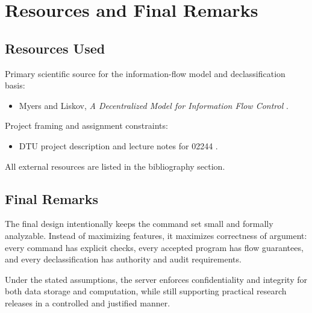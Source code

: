\section{Resources and Final Remarks}

\subsection{Resources Used}

Primary scientific source for the information-flow model and declassification basis:
\begin{itemize}
	\item Myers and Liskov, \emph{A Decentralized Model for Information Flow Control} \cite{MyersLiskov97}.
\end{itemize}

Project framing and assignment constraints:
\begin{itemize}
	\item DTU project description and lecture notes for 02244 \cite{ProjectDescription,Week4,Week5}.
\end{itemize}

All external resources are listed in the bibliography section.

\subsection{Final Remarks}

The final design intentionally keeps the command set small and formally analyzable. Instead of maximizing features, it maximizes correctness of argument: every command has explicit checks, every accepted program has flow guarantees, and every declassification has authority and audit requirements.

Under the stated assumptions, the server enforces confidentiality and integrity for both data storage and computation, while still supporting practical research releases in a controlled and justified manner.


